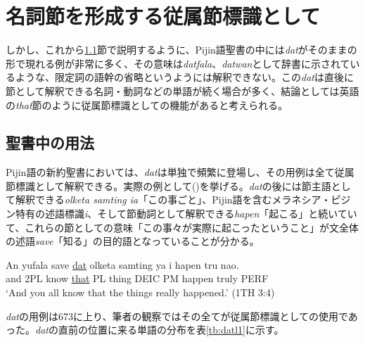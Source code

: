 \section{名詞節を形成する従属節標識として}

しかし、これから\ref{sec:datbib}節で説明するように、Pijin語聖書の中には\textit{dat}がそのままの形で現れる例が非常に多く、その意味は\textit{datfala}、\textit{datwan}として辞書に示されているような、限定詞の語幹の省略というようには解釈できない。この\textit{dat}は直後に節として解釈できる名詞・動詞などの単語が続く場合が多く、結論としては英語の\textit{that}節のように従属節標識としての機能があると考えられる。

\subsection{聖書中の用法}\label{sec:datbib}
Pijin語の新約聖書においては、\textit{dat}は単独で頻繁に登場し、その用例は全て従属節標識として解釈できる。実際の例として()を挙げる。\textit{dat}の後には節主語として解釈できる\textit{olketa samting ia}「この事ごと」、Pijin語を含むメラネシア・ピジン特有の述語標識\textit{i}、そして節動詞として解釈できる\textit{hapen}「起こる」と続いていて、これらの節としての意味「この事々が実際に起こったということ」が文全体の述語\textit{save}「知る」の目的語となっていることが分かる。

\begin{exe}
\ex
\gll An yufala save \underline{dat} olketa samting ya i hapen tru nao.\\
and 2PL know \underline{that} PL thing DEIC PM happen truly PERF\\
\glt `And you all know that the things really happened.' (1TH 3:4)
\end{exe}

\textit{dat}の用例は673に上り、筆者の観察ではその全てが従属節標識としての使用であった。\textit{dat}の直前の位置に来る単語の分布を表\ref{tb:datl1}に示す。

